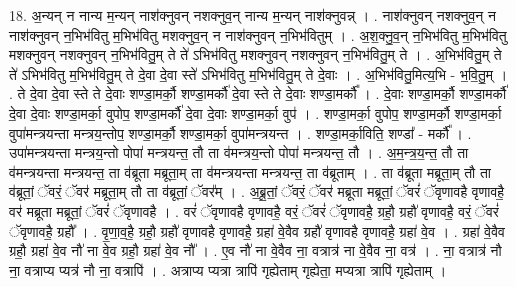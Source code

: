 \documentclass[17pt]{extarticle}
\begin{document}
18. अ॒न्यन् न नान्य म॒न्यन् नाश॑क्नुवन् नशक्नुव॒न् नान्य म॒न्यन् नाश॑क्नुवन्न् । . नाश॑क्नुवन् नशक्नुव॒न् न नाश॑क्नुवन् न॒भिभ॑वितु म॒भिभ॑वितु मशक्नुव॒न् न नाश॑क्नुवन् न॒भिभ॑वितुम् । . अ॒श॒क्नु॒व॒न् न॒भिभ॑वितु म॒भिभ॑वितु मशक्नुवन् नशक्नुवन् न॒भिभ॑वितु॒म् ते ते॑ ऽभिभ॑वितु मशक्नुवन् नशक्नुवन् न॒भिभ॑वितु॒म् ते । . अ॒भिभ॑वितु॒म् ते ते॑ ऽभिभ॑वितु म॒भिभ॑वितु॒म् ते दे॒वा दे॒वा स्ते॑ ऽभिभ॑वितु म॒भिभ॑वितु॒म् ते दे॒वाः । . अ॒भिभ॑वितु॒मित्य॒भि - भ॒वि॒तु॒म् । . ते दे॒वा दे॒वा स्ते ते दे॒वाः शण्डा॒मर्कौ॒ शण्डा॒मर्कौ॑ दे॒वा स्ते ते दे॒वाः शण्डा॒मर्कौ᳚ । . दे॒वाः शण्डा॒मर्कौ॒ शण्डा॒मर्कौ॑ दे॒वा दे॒वाः शण्डा॒मर्का॒ वुपोप॒ शण्डा॒मर्कौ॑ दे॒वा दे॒वाः शण्डा॒मर्का॒ वुप॑ । . शण्डा॒मर्का॒ वुपोप॒ शण्डा॒मर्कौ॒ शण्डा॒मर्का॒ वुपा॑मन्त्रयन्ता मन्त्रय॒न्तोप॒ शण्डा॒मर्कौ॒ शण्डा॒मर्का॒ वुपा॑मन्त्रयन्त । . शण्डा॒मर्का॒विति॒ शण्डा᳚ - मर्कौ᳚ । . उपा॑मन्त्रयन्ता मन्त्रय॒न्तो पोपा॑ मन्त्रयन्त॒ तौ ता व॑मन्त्रय॒न्तो पोपा॑ मन्त्रयन्त॒ तौ । . अ॒म॒न्त्र॒य॒न्त॒ तौ ता व॑मन्त्रयन्ता मन्त्रयन्त॒ ता व॑ब्रूता मब्रूता॒म् ता व॑मन्त्रयन्ता मन्त्रयन्त॒ ता व॑ब्रूताम् । . ता व॑ब्रूता मब्रूता॒म् तौ ता व॑ब्रूतां॒ ॅवरं॒ ॅवर॑ मब्रूता॒म् तौ ता व॑ब्रूतां॒ ॅवर᳚म् । . अ॒ब्रू॒तां॒ ॅवरं॒ ॅवर॑ मब्रूता मब्रूतां॒ ॅवरं॑ ॅवृणावहै वृणावहै॒ वर॑ मब्रूता मब्रूतां॒ ॅवरं॑ ॅवृणावहै । . वरं॑ ॅवृणावहै वृणावहै॒ वरं॒ ॅवरं॑ ॅवृणावहै॒ ग्रहौ॒ ग्रहौ॑ वृणावहै॒ वरं॒ ॅवरं॑ ॅवृणावहै॒ ग्रहौ᳚ । . वृ॒णा॒व॒है॒ ग्रहौ॒ ग्रहौ॑ वृणावहै वृणावहै॒ ग्रहा॑ वे॒वैव ग्रहौ॑ वृणावहै वृणावहै॒ ग्रहा॑ वे॒व । . ग्रहा॑ वे॒वैव ग्रहौ॒ ग्रहा॑ वे॒व नौ॑ ना वे॒व ग्रहौ॒ ग्रहा॑ वे॒व नौ᳚ । . ए॒व नौ॑ ना वे॒वैव ना॒ वत्रात्र॑ ना वे॒वैव ना॒ वत्र॑ । . ना॒ वत्रात्र॑ नौ ना॒ वत्राप्य प्यत्र॑ नौ ना॒ वत्रापि॑ । . अत्राप्य प्यत्रा त्रापि॑ गृह्येताम् गृह्येता॒ मप्यत्रा त्रापि॑ गृह्येताम् । \newline
\end{document}
